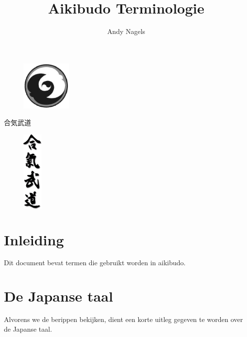 \documentclass[12pt]{scrartcl}
\begin{document}
\begin{CJK*}{UTF8}{min}
\CJKtilde

%
%
\title{Aikibudo Terminologie}
\author{Andy Nagels}
\maketitle
\thispagestyle{empty} %
\begin{figure}[H]
\centering
\includegraphics[width=2.5cm]{img/schild_aikibudo.eps}
\end{figure}

\begin{center}
合気武道
\end{center}

\begin{figure}[H]
\centering
\includegraphics[width=1.0cm]{img/aikibudo-kanji.eps}
\end{figure}

%
%
\newpage
\setcounter{page}{1}
\tableofcontents

%
%
\newpage
\setcounter{page}{1}


\section{Inleiding}
\noindent Dit document bevat termen die gebruikt worden in aikibudo.

\section{De Japanse taal}
\noindent Alvorens we de berippen bekijken, dient een korte uitleg gegeven te worden over de Japanse taal.\\


\end{CJK*}
\end{document}
